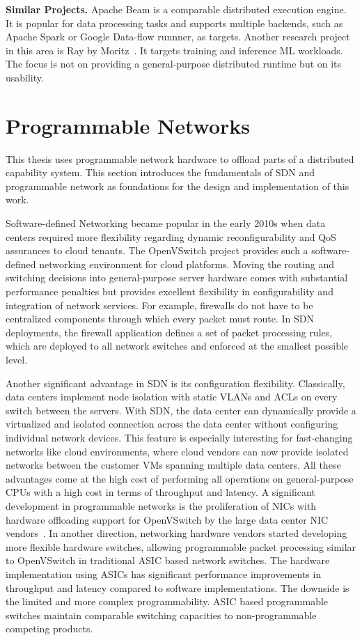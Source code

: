 \textbf{Similar Projects.}
Apache Beam is a comparable distributed execution engine. It is popular for data processing tasks and supports multiple backends, such as Apache Spark or Google Data-flow runnner, as targets. Another research project in this area is Ray by Moritz\etal{}~\cite{moritzRayDistributedFramework}. It targets training and inference \ac{ML} workloads. The focus is not on providing a general-purpose distributed runtime but on its usability.

\section{Programmable Networks}
This thesis uses programmable network hardware to offload parts of a distributed capability system. This section introduces the fundamentals of \ac{SDN} and programmable network as foundations for the design and implementation of this work.

Software-defined Networking became popular in the early 2010s when data centers required more flexibility regarding dynamic reconfigurability and \ac{QoS} assurances to cloud tenants. The OpenVSwitch project provides such a software-defined networking environment for cloud platforms. Moving the routing and switching decisions into general-purpose server hardware comes with substantial performance penalties but provides excellent flexibility in configurability and integration of network services. For example, firewalls do not have to be centralized components through which every packet must route. In \ac{SDN} deployments, the firewall application defines a set of packet processing rules, which are deployed to all network switches and enforced at the smallest possible level.

Another significant advantage in \ac{SDN} is its configuration flexibility. Classically, data centers implement node isolation with static \acp{VLAN} and \acp{ACL} on every switch between the servers. With \ac{SDN}, the data center can dynamically provide a virtualized and isolated connection across the data center without configuring individual network devices. This feature is especially interesting for fast-changing networks like cloud environments, where cloud vendors can now provide isolated networks between the customer \acp{VM} spanning multiple data centers. All these advantages come at the high cost of performing all operations on general-purpose \acp{CPU} with a high cost in terms of throughput and latency. A significant development in programmable networks is the proliferation of \acp{NIC} with hardware offloading support for OpenVSwitch by the large data center \ac{NIC} vendors~\cite{neutrondevelopmentteamOpenVSwitchHardware, intelIntelInfrastructureProcessing}\@. In another direction, networking hardware vendors started developing more flexible hardware switches, allowing programmable packet processing similar to OpenVSwitch in traditional \ac{ASIC} based network switches. The hardware implementation using \acp{ASIC} has significant performance improvements in throughput and latency compared to software implementations. The downside is the limited and more complex programmability. \ac{ASIC} based programmable switches maintain comparable switching capacities to non-programmable competing products.

